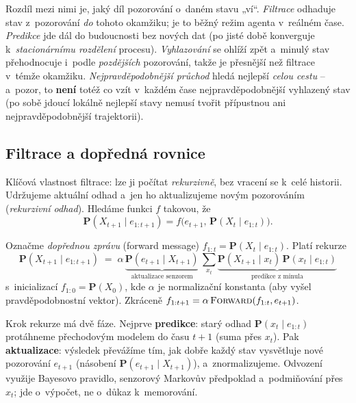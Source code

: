 \begin{intuice}
Rozdíl mezi nimi je, jaký díl pozorování o~daném stavu „ví``. \emph{Filtrace} odhaduje stav z~pozorování \emph{do} tohoto okamžiku; je to běžný režim agenta v~reálném čase. \emph{Predikce} jde dál do budoucnosti bez nových dat (po jisté době konverguje k~\emph{stacionárnímu rozdělení} procesu). \emph{Vyhlazování} se ohlíží zpět a~minulý stav přehodnocuje i~podle \emph{pozdějších} pozorování, takže je přesnější než filtrace v~témže okamžiku. \emph{Nejpravděpodobnější průchod} hledá nejlepší \emph{celou cestu} -- a~pozor, to \textbf{není} totéž co vzít v~každém čase nejpravděpodobnější vyhlazený stav (po sobě jdoucí lokálně nejlepší stavy nemusí tvořit přípustnou ani nejpravděpodobnější trajektorii).
\end{intuice}

\subsection{Filtrace a dopředná rovnice}

Klíčová vlastnost filtrace: lze ji počítat \emph{rekurzivně}, bez vracení se k~celé historii. Udržujeme aktuální odhad a~jen ho aktualizujeme novým pozorováním (\emph{rekurzivní odhad}). Hledáme funkci $f$ takovou, že
\[
  \mathbf{P}(X_{t+1}\mid e_{1:t+1}) = f\big(e_{t+1},\, \mathbf{P}(X_t\mid e_{1:t})\big).
\]

\begin{veta}
Označme \emph{dopřednou zprávu} (forward message) $f_{1:t} = \mathbf{P}(X_t\mid e_{1:t})$. Platí rekurze
\[
  \boxed{\ \mathbf{P}(X_{t+1}\mid e_{1:t+1}) \;=\; \alpha\,\underbrace{\mathbf{P}(e_{t+1}\mid X_{t+1})}_{\text{aktualizace senzorem}}\,
  \sum_{x_t}\underbrace{\mathbf{P}(X_{t+1}\mid x_t)\,\mathbf{P}(x_t\mid e_{1:t})}_{\text{predikce z minula}}\ }
\]
s~inicializací $f_{1:0}=\mathbf{P}(X_0)$, kde $\alpha$ je normalizační konstanta (aby vyšel pravděpodobnostní vektor). Zkráceně $f_{1:t+1} = \alpha\,\textsc{Forward}(f_{1:t},e_{t+1})$.
\end{veta}

\begin{intuice}
Krok rekurze má dvě fáze. Nejprve \textbf{predikce}: starý odhad $\mathbf{P}(x_t\mid e_{1:t})$ protáhneme přechodovým modelem do času $t+1$ (suma přes $x_t$). Pak \textbf{aktualizace}: výsledek převážíme tím, jak dobře každý stav vysvětluje nové pozorování $e_{t+1}$ (násobení $\mathbf{P}(e_{t+1}\mid X_{t+1})$), a~znormalizujeme. Odvození využije Bayesovo pravidlo, senzorový Markovův předpoklad a~podmiňování přes $x_t$; jde o~výpočet, ne o~důkaz k~memorování.
\end{intuice}

